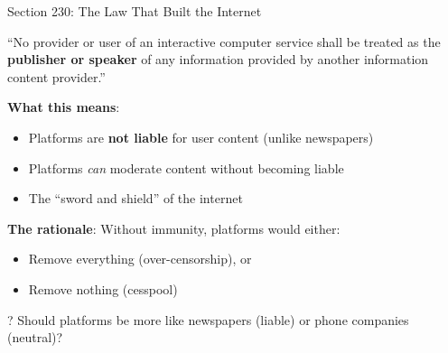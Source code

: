 ﻿\documentclass[aspectratio=169]{beamer}
\begin{document}
\begin{frame}{Section 230: The Law That Built the Internet}
\begin{casestudybox}
``No provider or user of an interactive computer service shall be treated as the \textbf{publisher or speaker} of any information provided by another information content provider.''
\end{casestudybox}

\vspace{0.2cm}
\textbf{What this means}:
\begin{itemize}
    \item Platforms are \textbf{not liable} for user content (unlike newspapers)
    \item Platforms \textit{can} moderate content without becoming liable
    \item The ``sword and shield'' of the internet
\end{itemize}

\vspace{0.2cm}
\textbf{The rationale}: Without immunity, platforms would either:
\begin{itemize}
    \item Remove everything (over-censorship), or
    \item Remove nothing (cesspool)
\end{itemize}

\begin{alertblock}{?}
Should platforms be more like newspapers (liable) or phone companies (neutral)?
\end{alertblock}
\end{frame}
\end{document}

